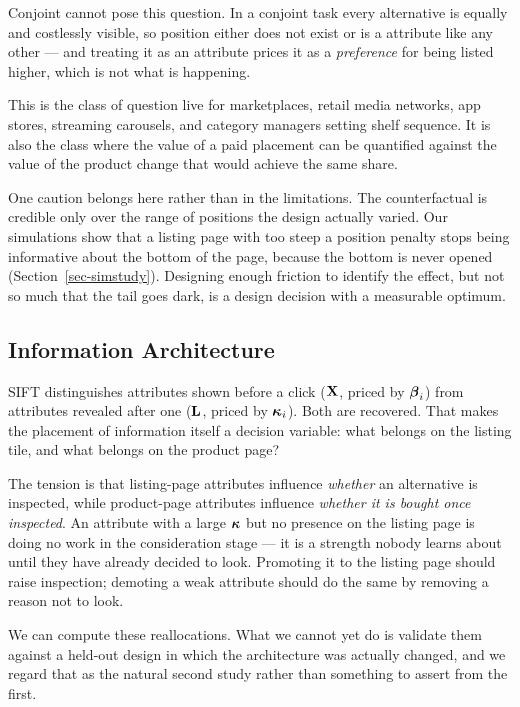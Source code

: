 \documentclass[
  letterpaper,
  DIV=11,
  numbers=noendperiod]{scrartcl}
\begin{document}
Conjoint cannot pose this question. In a conjoint task every alternative
is equally and costlessly visible, so position either does not exist or
is a attribute like any other --- and treating it as an attribute prices
it as a \emph{preference} for being listed higher, which is not what is
happening.

This is the class of question live for marketplaces, retail media
networks, app stores, streaming carousels, and category managers setting
shelf sequence. It is also the class where the value of a paid placement
can be quantified against the value of the product change that would
achieve the same share.

One caution belongs here rather than in the limitations. The
counterfactual is credible only over the range of positions the design
actually varied. Our simulations show that a listing page with too steep
a position penalty stops being informative about the bottom of the page,
because the bottom is never opened (Section~\ref{sec-simstudy}).
Designing enough friction to identify the effect, but not so much that
the tail goes dark, is a design decision with a measurable optimum.

\subsection{Information Architecture}\label{sec-managerial-architecture}

SIFT distinguishes attributes shown before a click (\(\mathbf{X}\), priced by
\(\boldsymbol{\beta}_i\)) from attributes revealed after one (\(\mathbf{L}\), priced by
\(\boldsymbol{\kappa}_i\)). Both are recovered. That makes the placement of
information itself a decision variable: what belongs on the listing
tile, and what belongs on the product page?

The tension is that listing-page attributes influence \emph{whether} an
alternative is inspected, while product-page attributes influence
\emph{whether it is bought once inspected}. An attribute with a large
\(\boldsymbol{\kappa}\) but no presence on the listing page is doing no work in the
consideration stage --- it is a strength nobody learns about until they
have already decided to look. Promoting it to the listing page should
raise inspection; demoting a weak attribute should do the same by
removing a reason not to look.

We can compute these reallocations. What we cannot yet do is validate
them against a held-out design in which the architecture was actually
changed, and we regard that as the natural second study rather than
something to assert from the first.
\end{document}
